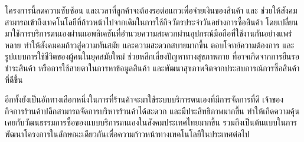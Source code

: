 \par โครงการนี้ลดความซับซ้อน และเวลาที่ลูกค้าจะต้องรอต่อแถวเพื่อจ่ายเงินของสินค้า
และ ช่วยให้สังคมสามารถเข้าถึงเทคโนโลยีที่ก้าวหน้าไปจากเดิมในการใช้กิจวัตรประจำวันอย่างการซื้อสินค้า
โดยเปลี่ยนมาใช้การบริการตนเองผ่านแอพลิเคชันที่อำนวยความสะดวกผ่านอุปกรณ์มือถือที่ใช้งานกันอย่างแพร่หลาย
ทำให้สังคมคมก้าวสู่ความทันสมัย และความสะดวกสบายมากขึ้น ตอบโจทย์ความต้องการ และรูปแบบการใช้ชีวิตของผู้คนในยุคสมัยใหม่
ช่วยหลีกเลี่ยงปัญหาทางสุขภาพกาย ที่อาจเกิดจากการยืนรอชำระสินค้า หรือการใช้สายตาในการหาข้อมูลสินค้า
และพัฒนาสุขภาพจิตจากประสบการณ์การซื้อสินค้าที่ดีขึ้น
\par อีกทั้งยังเป็นอักทางเลือกหนึ่งในการที่ร้านค้าจะมาใช้ระบบบริการตนเองที่มีการจัดการที่ดี
เจ้าของกิจการร้านค้าปลีกสามารถจัดการบริหารร้านค้าได้สะดวก
และมีประสิทธิภาพมากขึ้น ทำให้เกิดความคุ้นเคยกับวัฒนธรรมการซื้อของแบบบริการตนเองในสังคมประเทศไทยมากขึ้น
รวมถึงเป็นต้นแบบในการพัฒนาโครงการในลักษณะเดียวกันเพื่อความก้าวหน้าทางเทคโนโลยีในประเทศต่อไป